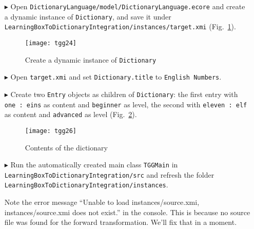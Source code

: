 \begin{enumerate}
\item[$\blacktriangleright$] Open \texttt{Dictionary\-Language/model/Dictionary\-Language.ecore} and create a dynamic instance of \texttt{Dictionary}, and save it under \texttt{Learn\-ing\-Box\-To\-Dictionary\-In\-te\-gra\-tion/in\-stan\-ces/target.xmi} (Fig.~\ref{fig:create_instance_dict}).

\begin{figure}[htbp]
\begin{center}
  \texttt{[image: tgg24]}
  \caption{Create a dynamic instance of \texttt{Dictionary}}
  \label{fig:create_instance_dict}
\end{center}
\end{figure}

\item[$\blacktriangleright$] Open \texttt{target.xmi} and set \texttt{Dictionary.title} to \texttt{English Numbers}.
\item[$\blacktriangleright$] Create two \texttt{Entry} objects as children of \texttt{Dictionary}: the first entry with \texttt{one : eins} as content and \texttt{beginner} as level, the second with \texttt{eleven : elf} as content and \texttt{advanced} as level (Fig.~\ref{fig:dictionaryxmi}).

\begin{figure}[htbp]
\begin{center}
  \texttt{[image: tgg26]}
  \caption{Contents of the dictionary}
  \label{fig:dictionaryxmi}
\end{center}
\end{figure}

\item[$\blacktriangleright$] Run the automatically created main class \texttt{TGGMain} in \texttt{LearningBox\-To\-Dictionary\-In\-te\-gra\-tion\-/src} and refresh the folder \texttt{LearningBox\-To\-Dictionary\-In\-te\-gra\-tion/\-instances}. 

Note the error message ``Unable to load instances/source.xmi, instances/source.xmi does not exist.'' in the console.
This is because no source file was found for the forward transformation.
We'll fix that in a moment.
\end{enumerate}

